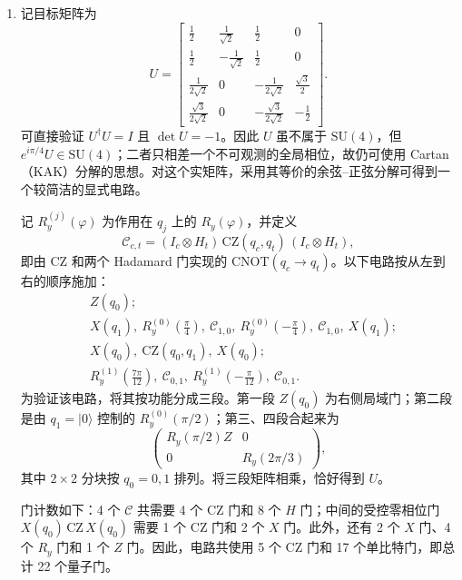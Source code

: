 \documentclass{ctexart}
\newcommand{\ket}[1]{|#1\rangle}
\begin{document}
\begin{enumerate}
    \item[(f)] 记目标矩阵为
    \begin{equation*}
        U=\begin{bmatrix}
            \frac{1}{2} & \frac{1}{\sqrt{2}} & \frac{1}{2} & 0 \\[5pt]
            \frac{1}{2} & -\frac{1}{\sqrt{2}} & \frac{1}{2} & 0 \\[5pt]
            \frac{1}{2\sqrt{2}} & 0 & -\frac{1}{2\sqrt{2}} & \frac{\sqrt{3}}{2} \\[5pt]
            \frac{\sqrt{3}}{2\sqrt{2}} & 0 & -\frac{\sqrt{3}}{2\sqrt{2}} & -\frac{1}{2}
        \end{bmatrix}.
    \end{equation*}
    可直接验证 $U^\dagger U=I$ 且 $\det U=-1$。因此 $U$ 虽不属于 $\mathrm{SU}(4)$，但 $e^{i\pi/4}U\in\mathrm{SU}(4)$；二者只相差一个不可观测的全局相位，故仍可使用 Cartan（KAK）分解的思想。对这个实矩阵，采用其等价的余弦--正弦分解可得到一个较简洁的显式电路。

    记 $R_y^{(j)}(\varphi)$ 为作用在 $q_j$ 上的 $R_y(\varphi)$，并定义
    \begin{equation*}
        \mathcal{C}_{c,t}=(I_c\otimes H_t)\,\mathrm{CZ}(q_c,q_t)\,(I_c\otimes H_t),
    \end{equation*}
    即由 CZ 和两个 Hadamard 门实现的 $\mathrm{CNOT}(q_c\to q_t)$。以下电路按从左到右的顺序施加：
    \begin{align*}
        &Z(q_0); \\[3pt]
        &X(q_1),\ R_y^{(0)}\!\left(\frac{\pi}{4}\right),\ \mathcal{C}_{1,0},\ R_y^{(0)}\!\left(-\frac{\pi}{4}\right),\ \mathcal{C}_{1,0},\ X(q_1); \\[3pt]
        &X(q_0),\ \mathrm{CZ}(q_0,q_1),\ X(q_0); \\[3pt]
        &R_y^{(1)}\!\left(\frac{7\pi}{12}\right),\ \mathcal{C}_{0,1},\ R_y^{(1)}\!\left(-\frac{\pi}{12}\right),\ \mathcal{C}_{0,1}.
    \end{align*}
    为验证该电路，将其按功能分成三段。第一段 $Z(q_0)$ 为右侧局域门；第二段是由 $q_1=\ket{0}$ 控制的 $R_y^{(0)}(\pi/2)$；第三、四段合起来为
    \begin{equation*}
        \begin{pmatrix}
            R_y(\pi/2)Z & 0 \\
            0 & R_y(2\pi/3)
        \end{pmatrix},
    \end{equation*}
    其中 $2\times2$ 分块按 $q_0=0,1$ 排列。将三段矩阵相乘，恰好得到 $U$。

    门计数如下：4 个 $\mathcal{C}$ 共需要 4 个 CZ 门和 8 个 $H$ 门；中间的受控零相位门 $X(q_0)\,\mathrm{CZ}\,X(q_0)$ 需要 1 个 CZ 门和 2 个 $X$ 门。此外，还有 2 个 $X$ 门、4 个 $R_y$ 门和 1 个 $Z$ 门。因此，电路共使用 5 个 CZ 门和 17 个单比特门，即总计 22 个量子门。
\end{enumerate}
\end{document}
